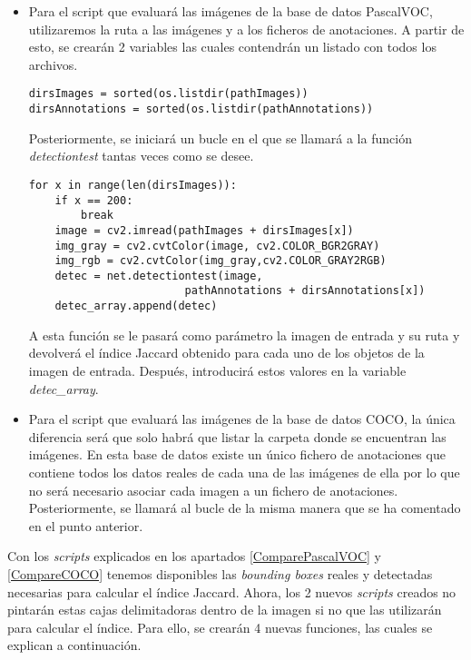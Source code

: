 \documentclass[a4paper, 12pt, oneside]{book}
\begin{document}
\begin{itemize}
\item Para el script que evaluará las imágenes de la base de datos PascalVOC, utilizaremos la ruta a las imágenes y a los ficheros de anotaciones. A partir de esto, se crearán 2 variables las cuales contendrán un listado con todos los archivos.\\

\begin{lstlisting}[frame=single]
dirsImages = sorted(os.listdir(pathImages))
dirsAnnotations = sorted(os.listdir(pathAnnotations))
\end{lstlisting}

Posteriormente, se iniciará un bucle en el que se llamará a la función \textit{detectiontest} tantas veces como se desee.\\

\begin{lstlisting}[frame=single]
for x in range(len(dirsImages)):
    if x == 200:
        break
    image = cv2.imread(pathImages + dirsImages[x])
    img_gray = cv2.cvtColor(image, cv2.COLOR_BGR2GRAY)
    img_rgb = cv2.cvtColor(img_gray,cv2.COLOR_GRAY2RGB)
    detec = net.detectiontest(image,
    					pathAnnotations + dirsAnnotations[x])
    detec_array.append(detec)
\end{lstlisting}

A esta función se le pasará como parámetro la imagen de entrada y su ruta y devolverá el índice Jaccard obtenido para cada uno de los objetos de la imagen de entrada. Después, introducirá estos valores en la variable \textit{detec\_array}.\\

\item Para el script que evaluará las imágenes de la base de datos COCO, la única diferencia será que solo habrá que listar la carpeta donde se encuentran las imágenes. En esta base de datos existe un único fichero de anotaciones que contiene todos los datos reales de cada una de las imágenes de ella por lo que no será necesario asociar cada imagen a un fichero de anotaciones. Posteriormente, se llamará al bucle de la misma manera que se ha comentado en el punto anterior.
\end{itemize}

Con los \textit{scripts} explicados en los apartados \ref{ComparePascalVOC} y \ref{CompareCOCO} tenemos disponibles las \textit{bounding boxes} reales y detectadas necesarias para calcular el índice Jaccard. Ahora, los 2 nuevos \textit{scripts} creados no pintarán estas cajas delimitadoras dentro de la imagen si no que las utilizarán para calcular el índice. Para ello, se crearán 4 nuevas funciones, las cuales se explican a continuación.\\ 
\end{document}
